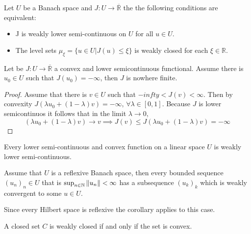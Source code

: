\begin{theorem}
	Let $U$ be a Banach space and $J:U \rightarrow \overline{\mathbb{R}}$ the the following conditions are equivalent:
	\begin{itemize}
		\item J is weakly lower semi-continuous on $U$ for all $u\in U$.
		\item The level sets $\mu_\xi = \lbrace u \in U | J(u)\leq \xi \rbrace$ is weakly closed for each $\xi \in \mathbb{R}$.
	\end{itemize}
\end{theorem}

\begin{lemma}
	Let be $J: U \rightarrow \overline{\mathbb{R}}$ a convex and lower semicontinuous functional. Assume there is $u_0 \in U$ such that $J(u_0)=-\infty$, then $J$ is nowhere finite.
	\begin{proof}
		Assume that there is $v\in U$ such that $-infty< J(v)< \infty$. Then by convexity $J(\lambda u_0 + (1-\lambda)v)=- \infty$, $\forall \lambda \in [0,1]$. Because $J$ is lower semicontinuos it follows that in the limit $\lambda \rightarrow 0$, 
		\[
			(\lambda u_0 +(1-\lambda)v) \rightarrow v \implies J(v)\leq J(\lambda u_0 +(1-\lambda)v)=-\infty
		\]
	\end{proof}
\end{lemma}
\begin{lemma}
	Every lower semi-continuous and convex function on a linear space $U$ is weakly lower semi-continuous.
\end{lemma}

\begin{corollary}
	Assume that $U$ is a reflexive Banach space, then every bounded sequence $(u_n)_n \in U$ that is $\sup_{n\in \mathbb{N}} \left\lVert u_n\right\rVert<\infty$ has a subsequence $(u_k)_k$ which is weakly convergent to some $u\in U$. 
\end{corollary}

\begin{remark}
	Since every Hilbert space is reflexive the corollary applies to this case.
\end{remark}

\begin{lemma}
	A closed set $C$ is weakly closed if and only if the set is convex.
\end{lemma}

